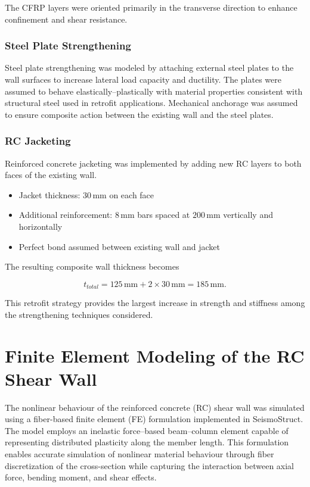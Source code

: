 \documentclass[fleqn,10pt]{wlscirep}
\begin{document}
The CFRP layers were oriented primarily in the transverse direction to enhance confinement and shear resistance.

\subsubsection{Steel Plate Strengthening}

Steel plate strengthening was modeled by attaching external steel plates to the wall surfaces to increase lateral load capacity and ductility. 
The plates were assumed to behave elastically--plastically with material properties consistent with structural steel used in retrofit applications. 
Mechanical anchorage was assumed to ensure composite action between the existing wall and the steel plates.

\subsubsection{RC Jacketing}

Reinforced concrete jacketing was implemented by adding new RC layers to both faces of the existing wall.

\begin{itemize}
\item Jacket thickness: $30\,\text{mm}$ on each face
\item Additional reinforcement: $8\,\text{mm}$ bars spaced at $200\,\text{mm}$ vertically and horizontally
\item Perfect bond assumed between existing wall and jacket
\end{itemize}

The resulting composite wall thickness becomes

\[
t_{total} = 125\,\text{mm} + 2 \times 30\,\text{mm} = 185\,\text{mm}.
\]

This retrofit strategy provides the largest increase in strength and stiffness among the strengthening techniques considered.


\section{Finite Element Modeling of the RC Shear Wall}

The nonlinear behaviour of the reinforced concrete (RC) shear wall was simulated using a fiber-based finite element (FE) formulation implemented in SeismoStruct. 
The model employs an inelastic force--based beam--column element capable of representing distributed plasticity along the member length. 
This formulation enables accurate simulation of nonlinear material behaviour through fiber discretization of the cross-section while capturing the interaction between axial force, bending moment, and shear effects.
\end{document}
